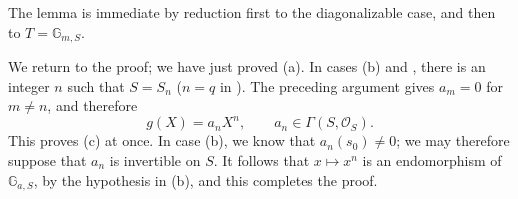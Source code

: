 The lemma is immediate by reduction first to the diagonalizable
case, and then to \(T=\mathbb G_{m,S}\).

We return to the proof; we have just proved
\textup{(a)}.  In cases \textup{(b)} and \textup{}, there is an
integer \(n\) such that \(S=S_n\) \textup{(\(n=q\) in
\textup{})}.  The preceding argument gives \(a_m=0\) for
\(m\ne n\), and therefore
\[
  g(X)=a_nX^n,
  \qquad
  a_n\in\Gamma(S,\mathcal O_S).
\]
This proves \textup{(c)} at once.  In case \textup{(b)}, we know
that \(a_n(s_0)\ne0\); we may therefore suppose that \(a_n\) is
invertible on \(S\).  It follows that \(x\longmapsto x^n\) is an
endomorphism of \(\mathbb G_{a,S}\), by the hypothesis in
\textup{(b)}, and this completes the proof.


